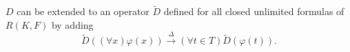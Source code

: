 $D$ can be extended to an operator $\tilde{D}$ defined for all closed unlimited formulas of $R(K, F)$ by adding
$$\tilde{D}((\forall x)\varphi(x)) \xrightarrow{\Delta} (\forall t \in T) \tilde{D}(\varphi(t)).$$
